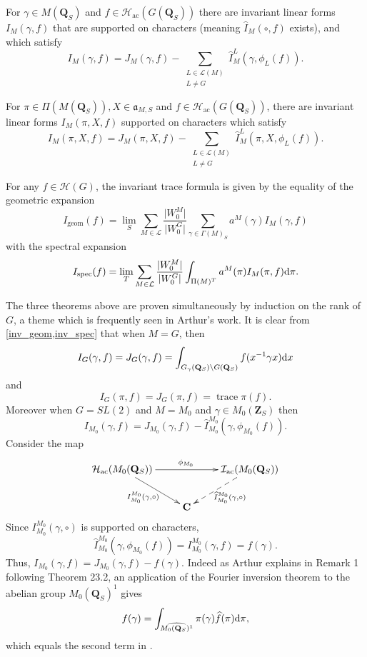 \documentclass{ims9x6}
\def\C{\mathbf C}
\def\Q{\mathbf Q}
\def\Z{\mathbf Z}
\def\HHH{\mathcal H}
\def\III{\mathcal I}
\def\LLL{\mathcal L}
\def\aaa{\mathfrak a}
\def\d{\text d}
\def\bs{\setminus}
\def\mod#1{\lvert #1 \rvert} %
\def\trace{\operatorname{trace}}
\begin{document}
\begin{theorem} \label{inv_geom}
For $\gamma \in M(\Q_S)$ and $f \in \HHH_{\text{ac}}(G(\Q_S))$ there are invariant linear forms $I_M(\gamma, f)$ that are supported on characters (meaning $\widehat I_M(\circ, f)$ exists), and which satisfy 
\[ I_M(\gamma, f) = J_M(\gamma, f) - \sum_{\substack{L \in \LLL(M) \\ L \neq G}} \widehat I_M^L(\gamma, \phi_L(f)). \]
\end{theorem}

\begin{theorem} \label{inv_spec}
For $\pi \in \Pi(M(\Q_S)), X \in \aaa_{M, S}$ and $f \in \HHH_{\text{ac}}(G(\Q_S))$, there are invariant linear forms $I_M(\pi, X, f)$ supported on characters which satisfy
\[ I_M(\pi, X, f) = J_M(\pi, X, f) - \sum_{\substack{L \in \LLL(M) \\ L \neq G}} \widehat I_M^L(\pi, X, \phi_L(f)). \]
\end{theorem}

\begin{theorem} \label{invtf}
For any $f \in \HHH(G)$, the invariant trace formula is given by the equality of the geometric expansion
\[ I_{\text{geom}}(f) = \lim_S \sum_{M \in \LLL} \frac{\mod{W_0^M}}{\mod{W_0^G}} \sum_{\gamma \in \Gamma(M)_S} a^M(\gamma) I_M(\gamma, f) \]
with the spectral expansion
\[ I_{\text{spec}}(f) = \lim_T \sum_{M \in \LLL} \frac{\mod{W_0^M}}{\mod{W_0^G}} \int_{\Pi(M)^T} a^M(\pi) I_M(\pi, f) \d \pi. \]
\end{theorem}

The three theorems above are proven simultaneously by induction on the rank of $G$, a theme which is frequently seen in Arthur's work. It is clear from \cref{inv_geom,inv_spec} that when $M=G$, then
\[ I_G(\gamma, f) = J_G(\gamma, f) = \int_{G_\gamma(\Q_S)\bs G(\Q_S)} f(x^{-1}\gamma x) \d x \]
and 
\[ I_G(\pi, f) = J_G(\pi, f) = \trace \pi(f). \]
Moreover when $G = SL(2)$ and $M = M_0$ and $\gamma \in M_0(\Z_S)$ then 
\[ I_{M_0}(\gamma, f) = J_{M_0}(\gamma, f) - \widehat I_{M_0}^{M_0} (\gamma, \phi_{M_0}(f)). \]
Consider the map
\[ \xymatrix{\HHH_{\text{ac}}(M_0(\Q_S)) \ar[rr]^{\phi_{M_0}}  \ar[dr]_{I_{M_0}^{M_0}(\gamma, \circ)} && \III_{\text{ac}}(M_0(\Q_S)) \ar@{-->}[dl]^{\widehat I_{M_0}^{M_0} (\gamma, \circ)} \\ & \C & } \]
Since $I_{M_0}^{M_0}(\gamma, \circ)$ is supported on characters, 
\[ \widehat I_{M_0}^{M_0}(\gamma, \phi_{M_0}(f)) = I_{M_0}^{M_0}(\gamma, f) = f(\gamma). \]
Thus, $I_{M_0}(\gamma, f) = J_{M_0}(\gamma, f) - f(\gamma)$. Indeed as Arthur explains in Remark 1 following Theorem 23.2, an application of the Fourier inversion theorem to the abelian group $M_0(\Q_S)^1$ gives
\begin{equation} \label{f_gamma}
f(\gamma) = \int_{\widehat{M_0(\Q_S)^1}} \pi(\gamma) \widehat f(\pi) \d \pi, 
\end{equation}
which equals the second term in \cite[Equation (22.13)]{clay}. 
\end{document}
